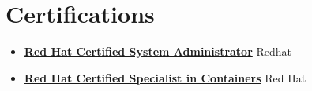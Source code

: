 \documentclass[a4paper,11pt]{article}
\makeatletter
\newcommand{\resumeItem}[2]{
  \item{
    \textbf{#1}{:\hspace{0.5mm}#2 \vspace{-0.5mm}}
  }
}
\newcommand{\resumeSubheading}[4]{
\vspace{0.5mm}\item
    \begin{tabular*}{0.98\textwidth}[t]{l@{\extracolsep{\fill}}r}
        \textbf{#1} & \textit{\footnotesize{#4}} \\
        \textit{\footnotesize{#3}} &  \footnotesize{#2}\\
    \end{tabular*}
    \vspace{-2.4mm}
}
\newcommand{\resumeSubItem}[2]{\resumeItem{#1}{#2}\vspace{-4pt}}
\newcommand{\resumeSubHeadingListStart}{\begin{itemize}[leftmargin=*,labelsep=0mm]}
\newcommand{\resumeHeadingSkillStart}{\begin{itemize}[leftmargin=*,itemsep=1.7mm, rightmargin=2ex]}
\newcommand{\resumeItemListStart}{\begin{justify}\begin{itemize}[leftmargin=3ex, rightmargin=2ex, noitemsep,labelsep=1.2mm,itemsep=0mm]\small}
\newcommand{\resumeSubHeadingListEnd}{\end{itemize}\vspace{2mm}}
\newcommand{\resumeHeadingSkillEnd}{\end{itemize}\vspace{-2mm}}
\newcommand{\resumeItemListEnd}{\end{itemize}\end{justify}\vspace{-2mm}}
\makeatother
\begin{document}

\vspace{-1mm}
\section{\textbf{Certifications}}
    \resumeItemListStart
        \item {\href{https://www.credly.com/badges/3fdf8b47-0513-4984-b88d-c86578b70ad9/public_url}{\textbf{ Red Hat Certified System Administrator}}}
        {Redhat} %
        \item {\href{https://www.credly.com/badges/27ef209c-dc83-45e6-a0af-16343bccc710/public_url}{\textbf{ Red Hat Certified Specialist in Containers}}}
        {Red Hat} %
    \resumeItemListEnd
\vspace{-4mm}

\end{document}
